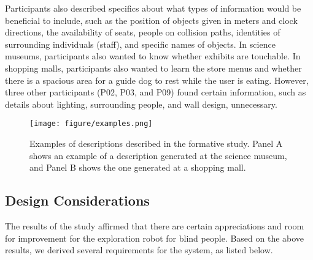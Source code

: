Participants also described specifics about what types of information would be beneficial to include, such as the position of objects given in meters and clock directions, the availability of seats, people on collision paths, identities of surrounding individuals (\eg staff), and specific names of objects. 
In science museums, participants also wanted to know whether exhibits are touchable. 
In shopping malls, participants also wanted to learn the store menus and whether there is a spacious area for a guide dog to rest while the user is eating.
However, three other participants (P02, P03, and P09) found certain information, such as details about lighting, surrounding people, and wall design, unnecessary. 

\begin{figure*}
    \centering
    \texttt{[image: figure/examples.png]}
    \caption{Examples of descriptions described in the formative study. Panel A shows an example of a description generated at the science museum, and Panel B shows the one generated at a shopping mall.}
    \label{fig:study1example}
\end{figure*}

\subsection{Design Considerations}
The results of the study affirmed that there are certain appreciations and room for improvement for the exploration robot for blind people.
Based on the above results, we derived several requirements for the system, as listed below.

